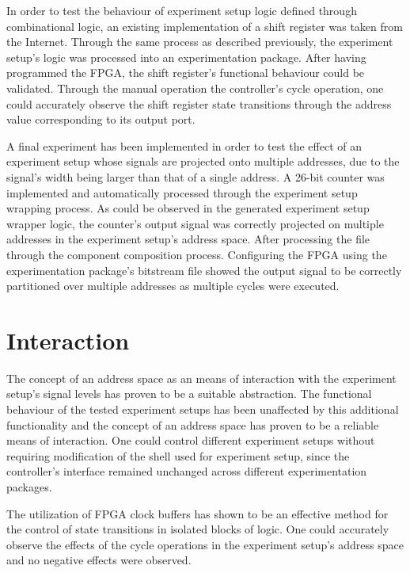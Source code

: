 \documentclass[main.tex]{subfiles}
\begin{document}
In order to test the behaviour of experiment setup logic defined through combinational logic, an existing implementation of a shift register was taken from the Internet. Through the same process as described previously, the experiment setup's logic was processed into an experimentation package. After having programmed the FPGA, the shift register's functional behaviour could be validated. Through the manual operation the controller's cycle operation, one could accurately observe the shift register state transitions through the address value corresponding to its output port. 

A final experiment has been implemented in order to test the effect of an experiment setup whose signals are projected onto multiple addresses, due to the signal's width being larger than that of a single address. A 26-bit counter was implemented and automatically processed through the experiment setup wrapping process. As could be observed in the generated experiment setup wrapper logic, the counter's output signal was correctly projected on multiple addresses in the experiment setup's address space. After processing the file through the component composition process. Configuring the FPGA using the experimentation package's bitstream file showed the output signal to be correctly partitioned over multiple addresses as multiple cycles were executed.

\section{Interaction}
The concept of an address space as an means of interaction with the experiment setup's signal levels has proven to be a suitable abstraction. The functional behaviour of the tested experiment setups has been unaffected by this additional functionality and the concept of an address space has proven to be a reliable means of interaction. One could control different experiment setups without requiring modification of the shell used for experiment setup, since the controller's interface remained unchanged across different experimentation packages. 

The utilization of FPGA clock buffers has shown to be an effective method for the control of state transitions in isolated blocks of logic. One could accurately observe the effects of the cycle operations in the experiment setup's address space and no negative effects were observed.   
\end{document}
